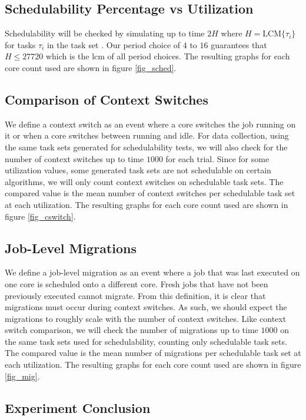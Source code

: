 \documentclass[conference,compsoc]{IEEEtran}
\begin{document}
\subsection{Schedulability Percentage vs Utilization}
Schedulability will be checked by simulating up to time $2H$ where $H = \text{LCM}\{\tau_i\}$ for tasks $\tau_i$ in the task set \cite{leung}. Our period choice of $4$ to $16$ guarantees that $H \leq 27720$ which is the lcm of all period choices. The resulting graphs for each core count used are shown in figure \ref{fig_sched}.

\subsection{Comparison of Context Switches}
We define a context switch as an event where a core switches the job running on it or when a core switches between running and idle. For data collection, using the same task sets generated for schedulability tests, we will also check for the number of context switches up to time $1000$ for each trial. Since for some utilization values, some generated task sets are not schedulable on certain algorithms, we will only count context switches on schedulable task sets. The compared value is the mean number of context switches per schedulable task set at each utilization. The resulting graphs for each core count used are shown in figure \ref{fig_cswitch}.

\subsection{Job-Level Migrations}
We define a job-level migration as an event where a job that was last executed on one core is scheduled onto a different core. Fresh jobs that have not been previously executed cannot migrate. From this definition, it is clear that migrations must occur during context switches. As such, we should expect the migrations to roughly scale with the number of context switches. Like context switch comparison, we will check the number of migrations up to time $1000$ on the same task sets used for schedulability, counting only schedulable task sets. The compared value is the mean number of migrations per schedulable task set at each utilization. The resulting graphs for each core count used are shown in figure \ref{fig_mig}.

\subsection{Experiment Conclusion}
\end{document}
